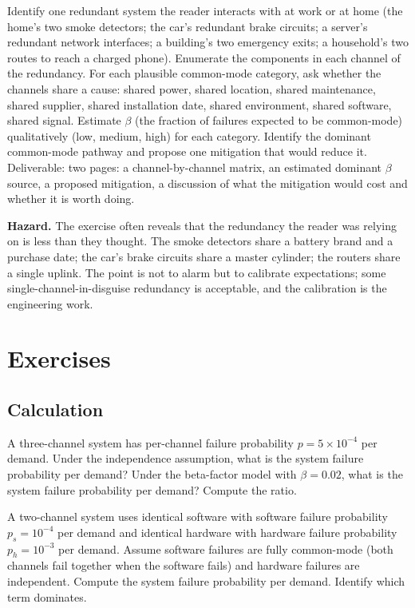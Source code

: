 \begin{project}
Identify one redundant system the reader interacts with at work or at home (the home's two smoke detectors; the car's redundant brake circuits; a server's redundant network interfaces; a building's two emergency exits; a household's two routes to reach a charged phone). Enumerate the components in each channel of the redundancy. For each plausible common-mode category, ask whether the channels share a cause: shared power, shared location, shared maintenance, shared supplier, shared installation date, shared environment, shared software, shared signal. Estimate $\beta$ (the fraction of failures expected to be common-mode) qualitatively (low, medium, high) for each category. Identify the dominant common-mode pathway and propose one mitigation that would reduce it. Deliverable: two pages: a channel-by-channel matrix, an estimated dominant $\beta$ source, a proposed mitigation, a discussion of what the mitigation would cost and whether it is worth doing.

\textbf{Hazard.} The exercise often reveals that the redundancy the reader was relying on is less than they thought. The smoke detectors share a battery brand and a purchase date; the car's brake circuits share a master cylinder; the routers share a single uplink. The point is not to alarm but to calibrate expectations; some single-channel-in-disguise redundancy is acceptable, and the calibration is the engineering work.
\end{project}

\section{Exercises}

\subsection*{Calculation}

\begin{exercise}
A three-channel system has per-channel failure probability $p = 5 \times 10^{-4}$ per demand. Under the independence assumption, what is the system failure probability per demand? Under the beta-factor model with $\beta = 0.02$, what is the system failure probability per demand? Compute the ratio.
\end{exercise}

\begin{exercise}
A two-channel system uses identical software with software failure probability $p_s = 10^{-4}$ per demand and identical hardware with hardware failure probability $p_h = 10^{-3}$ per demand. Assume software failures are fully common-mode (both channels fail together when the software fails) and hardware failures are independent. Compute the system failure probability per demand. Identify which term dominates.
\end{exercise}

